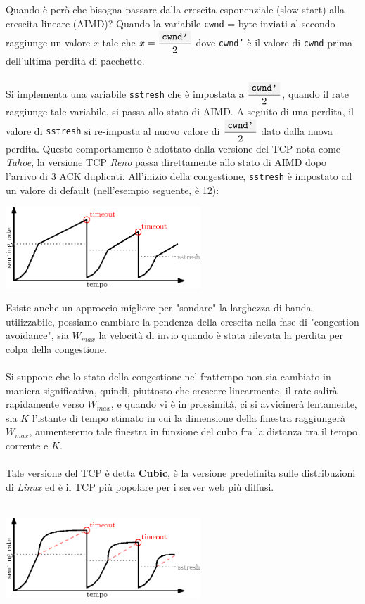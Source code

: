 \documentclass[12pt, letterpaper]{article}
\newcommand{\code}[1]{\colorbox{light-gray}{\texttt{#1}}}
\newcommand{\acc}{\\\hphantom{}\\}
\begin{document}
Quando è però che bisogna passare dalla crescita esponenziale (slow start) alla crescita
lineare (AIMD)? Quando la variabile \code{cwnd} = byte inviati al secondo raggiunge un valore
$x$ tale che $x = \dfrac{\code{cwnd'}}{2}$ dove \code{cwnd'} è il valore di \code{cwnd} prima dell'ultima perdita
di pacchetto. \acc
Si implementa una variabile \code{sstresh} che è impostata a $\dfrac{\code{cwnd'}}{2}$, quando il rate raggiunge
tale variabile, si passa allo stato di AIMD. A seguito di una perdita, il valore di \code{sstresh} si re-imposta
al nuovo valore di $\dfrac{\code{cwnd'}}{2}$ dato dalla nuova perdita. Questo comportamento è adottato dalla versione
del TCP nota come \textit{Tahoe}, la versione TCP \textit{Reno} passa direttamente allo stato di
AIMD dopo l'arrivo di 3 ACK duplicati. All'inizio della congestione, \code{sstresh} è impostato ad un valore di
default (nell'esempio seguente, è 12): \begin{center}
    \includegraphics[width=0.55\textwidth ]{images/sstresh.eps}
\end{center}
Esiste anche un approccio migliore per "sondare" la larghezza di banda utilizzabile, possiamo cambiare la pendenza
della crescita nella fase di "congestion avoidance", sia $W_{max}$ la velocità di invio quando è stata rilevata
la perdita per colpa della congestione.\acc Si suppone che lo stato della congestione nel frattempo non sia cambiato
in maniera significativa, quindi, piuttosto che crescere linearmente, il rate salirà
rapidamente verso $W_{max}$, e quando vi è in prossimità, ci si avvicinerà lentamente, sia $K$ l'istante di
tempo stimato in cui la dimensione della finestra raggiungerà $W_{max}$, aumenteremo tale finestra
in funzione del cubo fra la distanza tra il tempo corrente e $K$.\acc
Tale versione del TCP è detta \textbf{Cubic}, è la versione predefinita sulle distribuzioni di \textit{Linux} ed è
il TCP più popolare per i server web più diffusi.\acc
\begin{center}
    \includegraphics[width=0.55\textwidth ]{images/TCPcubic.eps}
\end{center}
\end{document}
